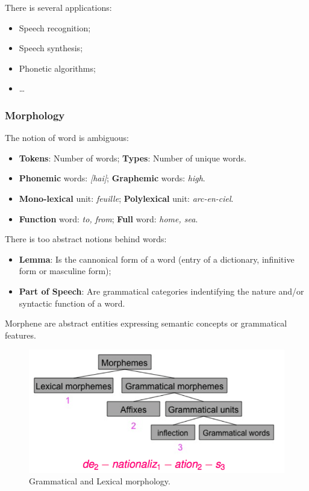 \vspace{10px}
There is several applications:
\begin{itemize}
	\item Speech recognition;
	\item Speech synthesis;
	\item Phonetic algorithms;
	\item \dots
\end{itemize}

\subsubsection{Morphology}

The notion of word is ambiguous:
\begin{itemize}
	\item \textbf{Tokens}: Number of words; \textbf{Types}: Number of unique words.
	\item \textbf{Phonemic} words: \textit{[hai]}; \textbf{Graphemic} words: \textit{high}.
	\item \textbf{Mono-lexical} unit: \textit{feuille}; \textbf{Polylexical} unit: \textit{arc-en-ciel}.
	\item \textbf{Function} word: \textit{to, from}; \textbf{Full} word: \textit{home, sea}.
\end{itemize}

\vspace{10px}

There is too abstract notions behind words:
\begin{itemize}
	\item \textbf{Lemma}: Is the cannonical form of a word (entry of a dictionary, infinitive form or masculine form);
	\item \textbf{Part of Speech}: Are grammatical categories indentifying the nature and/or syntactic function of a word.
\end{itemize}

\vspace{10px}

Morphene are abstract entities expressing semantic concepts or grammatical features.

\begin{figure}[htp]
	\centering
	\includegraphics[scale=0.4]{images/04_tree.png}
 	\caption{Grammatical and Lexical morphology.}
\end{figure}

